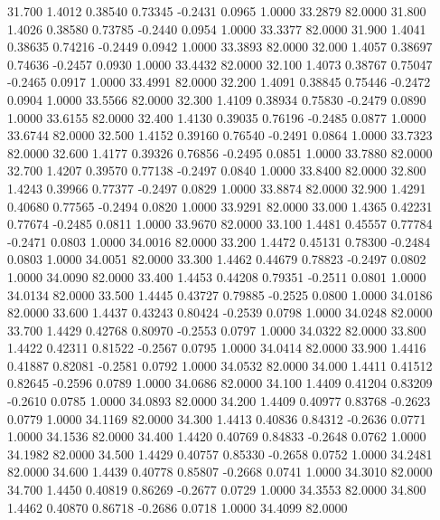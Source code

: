   31.700   1.4012   0.38540   0.73345  -0.2431   0.0965   1.0000  33.2879  82.0000
  31.800   1.4026   0.38580   0.73785  -0.2440   0.0954   1.0000  33.3377  82.0000
  31.900   1.4041   0.38635   0.74216  -0.2449   0.0942   1.0000  33.3893  82.0000
  32.000   1.4057   0.38697   0.74636  -0.2457   0.0930   1.0000  33.4432  82.0000
  32.100   1.4073   0.38767   0.75047  -0.2465   0.0917   1.0000  33.4991  82.0000
  32.200   1.4091   0.38845   0.75446  -0.2472   0.0904   1.0000  33.5566  82.0000
  32.300   1.4109   0.38934   0.75830  -0.2479   0.0890   1.0000  33.6155  82.0000
  32.400   1.4130   0.39035   0.76196  -0.2485   0.0877   1.0000  33.6744  82.0000
  32.500   1.4152   0.39160   0.76540  -0.2491   0.0864   1.0000  33.7323  82.0000
  32.600   1.4177   0.39326   0.76856  -0.2495   0.0851   1.0000  33.7880  82.0000
  32.700   1.4207   0.39570   0.77138  -0.2497   0.0840   1.0000  33.8400  82.0000
  32.800   1.4243   0.39966   0.77377  -0.2497   0.0829   1.0000  33.8874  82.0000
  32.900   1.4291   0.40680   0.77565  -0.2494   0.0820   1.0000  33.9291  82.0000
  33.000   1.4365   0.42231   0.77674  -0.2485   0.0811   1.0000  33.9670  82.0000
  33.100   1.4481   0.45557   0.77784  -0.2471   0.0803   1.0000  34.0016  82.0000
  33.200   1.4472   0.45131   0.78300  -0.2484   0.0803   1.0000  34.0051  82.0000
  33.300   1.4462   0.44679   0.78823  -0.2497   0.0802   1.0000  34.0090  82.0000
  33.400   1.4453   0.44208   0.79351  -0.2511   0.0801   1.0000  34.0134  82.0000
  33.500   1.4445   0.43727   0.79885  -0.2525   0.0800   1.0000  34.0186  82.0000
  33.600   1.4437   0.43243   0.80424  -0.2539   0.0798   1.0000  34.0248  82.0000
  33.700   1.4429   0.42768   0.80970  -0.2553   0.0797   1.0000  34.0322  82.0000
  33.800   1.4422   0.42311   0.81522  -0.2567   0.0795   1.0000  34.0414  82.0000
  33.900   1.4416   0.41887   0.82081  -0.2581   0.0792   1.0000  34.0532  82.0000
  34.000   1.4411   0.41512   0.82645  -0.2596   0.0789   1.0000  34.0686  82.0000
  34.100   1.4409   0.41204   0.83209  -0.2610   0.0785   1.0000  34.0893  82.0000
  34.200   1.4409   0.40977   0.83768  -0.2623   0.0779   1.0000  34.1169  82.0000
  34.300   1.4413   0.40836   0.84312  -0.2636   0.0771   1.0000  34.1536  82.0000
  34.400   1.4420   0.40769   0.84833  -0.2648   0.0762   1.0000  34.1982  82.0000
  34.500   1.4429   0.40757   0.85330  -0.2658   0.0752   1.0000  34.2481  82.0000
  34.600   1.4439   0.40778   0.85807  -0.2668   0.0741   1.0000  34.3010  82.0000
  34.700   1.4450   0.40819   0.86269  -0.2677   0.0729   1.0000  34.3553  82.0000
  34.800   1.4462   0.40870   0.86718  -0.2686   0.0718   1.0000  34.4099  82.0000
